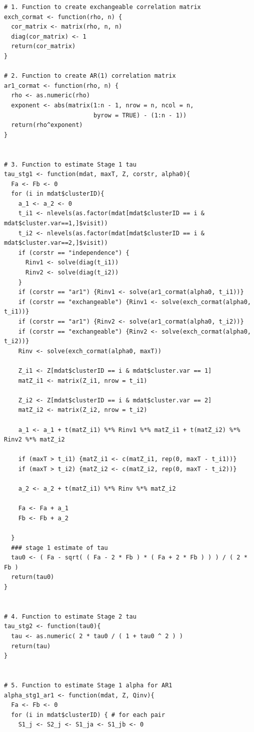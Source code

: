 \documentclass[
]{aft}
\begin{document}
\begin{verbatim}
# 1. Function to create exchangeable correlation matrix
exch_cormat <- function(rho, n) {
  cor_matrix <- matrix(rho, n, n)
  diag(cor_matrix) <- 1
  return(cor_matrix)
}

# 2. Function to create AR(1) correlation matrix
ar1_cormat <- function(rho, n) {
  rho <- as.numeric(rho)
  exponent <- abs(matrix(1:n - 1, nrow = n, ncol = n, 
                         byrow = TRUE) - (1:n - 1))
  return(rho^exponent)
}


# 3. Function to estimate Stage 1 tau 
tau_stg1 <- function(mdat, maxT, Z, corstr, alpha0){
  Fa <- Fb <- 0
  for (i in mdat$clusterID){
    a_1 <- a_2 <- 0
    t_i1 <- nlevels(as.factor(mdat[mdat$clusterID == i & mdat$cluster.var==1,]$visit))
    t_i2 <- nlevels(as.factor(mdat[mdat$clusterID == i & mdat$cluster.var==2,]$visit))
    if (corstr == "independence") {
      Rinv1 <- solve(diag(t_i1))
      Rinv2 <- solve(diag(t_i2))
    } 
    if (corstr == "ar1") {Rinv1 <- solve(ar1_cormat(alpha0, t_i1))} 
    if (corstr == "exchangeable") {Rinv1 <- solve(exch_cormat(alpha0, t_i1))}
    if (corstr == "ar1") {Rinv2 <- solve(ar1_cormat(alpha0, t_i2))} 
    if (corstr == "exchangeable") {Rinv2 <- solve(exch_cormat(alpha0, t_i2))}
    Rinv <- solve(exch_cormat(alpha0, maxT))
    
    Z_i1 <- Z[mdat$clusterID == i & mdat$cluster.var == 1]
    matZ_i1 <- matrix(Z_i1, nrow = t_i1)
    
    Z_i2 <- Z[mdat$clusterID == i & mdat$cluster.var == 2]
    matZ_i2 <- matrix(Z_i2, nrow = t_i2)
    
    a_1 <- a_1 + t(matZ_i1) %*% Rinv1 %*% matZ_i1 + t(matZ_i2) %*% Rinv2 %*% matZ_i2
    
    if (maxT > t_i1) {matZ_i1 <- c(matZ_i1, rep(0, maxT - t_i1))}
    if (maxT > t_i2) {matZ_i2 <- c(matZ_i2, rep(0, maxT - t_i2))}    
    
    a_2 <- a_2 + t(matZ_i1) %*% Rinv %*% matZ_i2
    
    Fa <- Fa + a_1
    Fb <- Fb + a_2
    
  }
  ### stage 1 estimate of tau
  tau0 <- ( Fa - sqrt( ( Fa - 2 * Fb ) * ( Fa + 2 * Fb ) ) ) / ( 2 * Fb )
  return(tau0)
}


# 4. Function to estimate Stage 2 tau
tau_stg2 <- function(tau0){
  tau <- as.numeric( 2 * tau0 / ( 1 + tau0 ^ 2 ) )
  return(tau)
}


# 5. Function to estimate Stage 1 alpha for AR1
alpha_stg1_ar1 <- function(mdat, Z, Qinv){
  Fa <- Fb <- 0 
  for (i in mdat$clusterID) { # for each pair
    S1_j <- S2_j <- S1_ja <- S1_jb <- 0
    

\end{verbatim}
\end{document}

